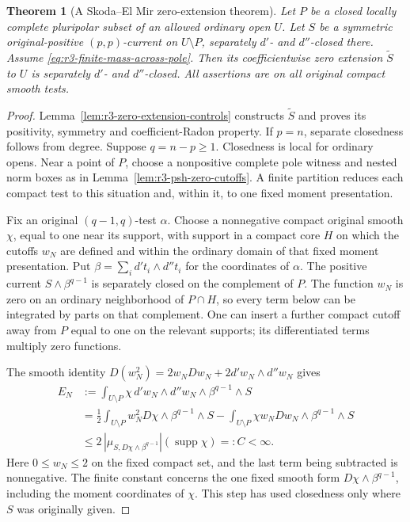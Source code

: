 \documentclass[11pt,a4paper]{article}
\numberwithin{equation}{section}
\newtheorem{theorem}{Theorem}[section]
\theoremstyle{definition}
\theoremstyle{remark}
\begin{document}
\begin{theorem}[A Skoda--El Mir zero-extension theorem]
\label{thm:r3-zero-extension}
Let $P$ be a closed locally complete pluripolar subset of
an allowed ordinary open $U$. Let $S$ be a symmetric
original-positive $(p,p)$-current on $U\setminus P$,
separately $d'$- and $d''$-closed there. Assume
\eqref{eq:r3-finite-mass-across-pole}. Then its
coefficientwise zero extension $\widetilde S$ to $U$
is separately $d'$- and $d''$-closed.
All assertions are on all original compact smooth tests.
\end{theorem}

\begin{proof}
Lemma~\ref{lem:r3-zero-extension-controls} constructs $\widetilde S$ and proves
its positivity, symmetry and coefficient-Radon property.
If $p=n$, separate closedness follows from degree. Suppose
$q=n-p\geq1$. Closedness is local for ordinary opens.
Near a point of $P$, choose a nonpositive complete pole
witness and nested norm boxes as in
Lemma~\ref{lem:r3-psh-zero-cutoffs}. A finite partition
reduces each compact test to this situation and, within
it, to one fixed moment presentation.

Fix an original $(q-1,q)$-test $\alpha$. Choose a
nonnegative compact original smooth $\chi$, equal to
one near its support, with support in a compact core
$H$ on which the cutoffs $w_N$ are defined and within
the ordinary domain of that fixed moment presentation. Put
$\beta=\sum_i d't_i\wedge d''t_i$ for the coordinates
of $\alpha$. The positive current
$S\wedge\beta^{q-1}$ is separately closed on the
complement of $P$. The function $w_N$ is zero on
an ordinary neighborhood of $P\cap H$, so every term
below can be integrated by parts on that complement.
One can insert a further compact cutoff away from $P$
equal to one on the relevant supports; its differentiated
terms multiply zero functions.

The smooth identity
$D(w_N^2)=2w_NDw_N+2d'w_N\wedge d''w_N$ gives
\begin{align*}
 E_N
 &:=\int_{U\setminus P}
        \chi\,d'w_N\wedge d''w_N\wedge\beta^{q-1}\wedge S\\
 &=\frac12\int_{U\setminus P}
        w_N^2D\chi\wedge\beta^{q-1}\wedge S
   -\int_{U\setminus P}
        \chi w_NDw_N\wedge\beta^{q-1}\wedge S\\
 &\leq 2\,|\mu_{S,D\chi\wedge\beta^{q-1}}|
                         (\operatorname{supp}\chi)
 =:C<\infty .
\end{align*}
Here $0\leq w_N\leq2$ on the fixed compact set, and
the last term being subtracted is nonnegative.
The finite constant concerns the one fixed smooth
form $D\chi\wedge\beta^{q-1}$, including the moment
coordinates of $\chi$. This step has used closedness
only where $S$ was originally given.


\end{proof}
\end{document}

